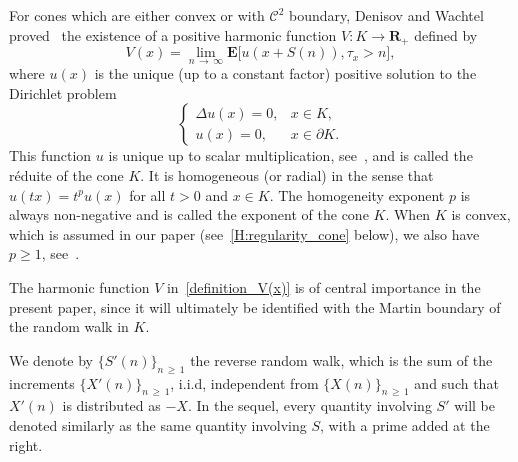 \documentclass[10pt]{amsart}
\theoremstyle{definition}\newtheorem{defi}[theo]{Definition}\newtheorem{rema}[theo]{Remark}\newtheorem{exam}[theo]{Example}\newtheorem{exem}[theo]{Example}\newtheorem{nota}[theo]{Notation}
\newcommand{\clC}{\mathcal{C}}
\newcommand{\e}{\mathbf{E}}
\newcommand{\bfR}{\mathbf{R}}
\renewcommand{\geq}{\geqslant}
\begin{document}
For cones which are either convex or with $\clC^{2}$ boundary, Denisov and Wachtel proved~\cite{DeWa-15,DeWa-19} the existence of a positive harmonic function $V:{K}\to \bfR_+$ defined by
\begin{equation}\label{definition_V(x)}
V(x)=\lim\limits_{n\,\rightarrow\,\infty}\e\big[u\left(x+S(n)\right)\!,\tau_{x}>n\big],
\end{equation}
where $u(x)$ is the unique (up to a constant factor) positive solution to the Dirichlet problem
\begin{equation}\label{eq:Dirichlet_problem}
\begin{cases}
\Delta u(x)=0,& x\in K,\\
u(x)=0,& x\in\partial K.
\end{cases}
\end{equation}
This function $u$ is unique up to scalar multiplication, see~\cite[Corollary~6.10 and Remark~6.11]{GySa-11}, and is called the réduite of the cone ${K}$. It is homogeneous (or radial) in the sense that $u(tx)=t^{p}u(x)$ for all $t>0$ and $x\in K$. The homogeneity exponent $p$ is always non-negative and is called the exponent of the cone ${K}$. When $K$ is convex, which is assumed in our paper (see~\eqref{H:regularity_cone} below), we also have $p\geq 1$, see~\cite{BaSm-97}.


The harmonic function $V$ in~\eqref{definition_V(x)} is of central importance in the present paper, since it will ultimately be identified with the Martin boundary of the random walk in ${K}$.

We denote by $\{S'(n)\}_{n\,\geq\,1}$ the reverse random walk, which is the sum of the increments $\{X'(n)\}_{n\,\geq\,1}$, i.i.d, independent from $\{X(n)\}_{n\,\geq\,1}$ and such that $X'(n)$ is distributed as $-X$. In the sequel, every quantity involving $S'$ will be denoted similarly as the same quantity involving $S$, with a prime added at the right.
\end{document}
